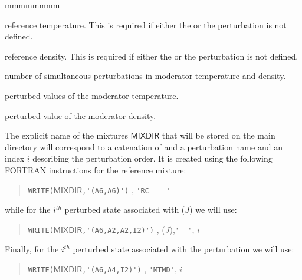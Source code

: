 \begin{ListeDeDescription}{mmmmmmmm}
\item[\dusa{valreft}] reference temperature. This is required if either the  or the 
perturbation is not defined.

\item[\dusa{valrefd}] reference density. This is required if either the  or the 
perturbation is not defined.

\item[\dusa{npert}] number of simultaneous perturbations in moderator temperature and density. 

\item[\dusa{valpert}] perturbed values of the moderator temperature.  

\item[\dusa{valperd}] perturbed value of the moderator density.  

\end{ListeDeDescription}

The explicit name of the mixtures $\mathsf{MIXDIR}$ that will be stored on the main  directory will
correspond to a catenation of  and a perturbation name and an index $i$ describing the perturbation
order. It is created using the following FORTRAN instructions for the reference mixture:
\begin{quote}
\verb*|WRITE(|$\mathsf{MIXDIR}$\verb*|,'(A6,A6)')| , \verb*|'RC    '| 
\end{quote}
while for the $i^{\mathit{th}}$ perturbed state associated with ($J$) we will use:
\begin{quote}
\verb*|WRITE(|$\mathsf{MIXDIR}$\verb*|,'(A6,A2,A2,I2)')| , ($J$),\verb*|'  '|, $i$ 
\end{quote}
Finally, for the $i^{\mathit{th}}$ perturbed state associated with the  perturbation we will use:
\begin{quote}
\verb*|WRITE(|$\mathsf{MIXDIR}$\verb*|,'(A6,A4,I2)')| , \verb*|'MTMD'|, $i$ 
\end{quote}

